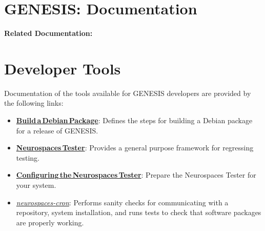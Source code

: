 \documentclass[12pt]{article}
\begin{document}
\section*{GENESIS: Documentation}

{\bf Related Documentation:}

\section*{Developer Tools}

Documentation of the tools available for GENESIS developers are provided by the following links:

\begin{itemize}
   \item[]\href{../build-debian/build-debian.tex}{\bf Build\,a\,Debian\,Package}: Defines the steps for building a Debian package for a release of GENESIS.
   \item[]\href{../neurospaces-tester/neurospaces-tester.tex}{\bf Neurospaces\,Tester}: Provides a general purpose framework for regressing testing. 
   \item[]\href{../tester-configuration/tester-configuration.tex}{\bf Configuring\,the\,Neurospaces\,Tester}: Prepare the Neurospaces Tester for your system.
   \item[]\href{../neurospaces-cron/neurospaces-cron.tex}{\it neurospaces-cron}: Performs sanity checks for communicating with a repository, system installation, and runs tests to check that software packages are properly working.

\end{itemize}
\end{document}
